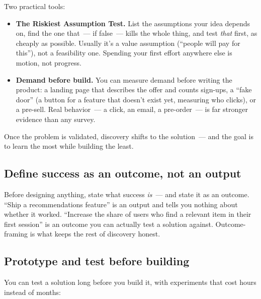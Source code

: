 Two practical tools:

\begin{itemize}
\tightlist
\item
  \textbf{The Riskiest Assumption Test.} List the assumptions your idea depends on, find the one that~---
  if false~--- kills the whole thing, and test \emph{that} first, as cheaply as possible. Usually it's a
  value assumption (``people will pay for this''), not a feasibility one. Spending your first effort
  anywhere else is motion, not progress.
\item
  \textbf{Demand before build.} You can measure demand before writing the product: a landing page that
  describes the offer and counts sign-ups, a ``fake door'' (a button for a feature that doesn't exist
  yet, measuring who clicks), or a pre-sell. Real behavior~--- a click, an email, a pre-order~--- is far
  stronger evidence than any survey.
\end{itemize}

\label{product-discovery:shaping-and-testing-the-solution-cheaply}

Once the problem is validated, discovery shifts to the solution~--- and the goal is to learn the most
while building the least.

\subsection*{Define success as an outcome, not an output}\label{product-discovery:define-success-as-an-outcome-not-an-output}

Before designing anything, state what success \emph{is}~--- and state it as an outcome. ``Ship a
recommendations feature'' is an output and tells you nothing about whether it worked. ``Increase the
share of users who find a relevant item in their first session'' is an outcome you can actually test
a solution against. Outcome-framing is what keeps the rest of discovery honest.

\subsection*{Prototype and test before building}\label{product-discovery:prototype-and-test-before-building}

You can test a solution long before you build it, with experiments that cost hours instead of
months:

